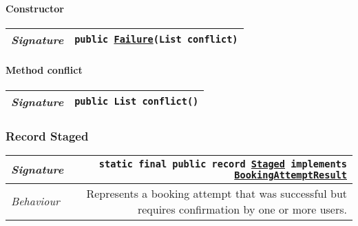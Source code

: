 \begin{adjustwidth}{1.5em}{0pt}
\begin{adjustwidth}{1.5em}{0pt}
\begin{adjustwidth}{1.5em}{0pt}
{\begin{tabularx}{1.0\linewidth}{@{}l R@{}}
      \end{tabularx}}\paragraph{Constructor\label{edu.kit.hci.soli.dto.BookingAttemptResult.Failure@edu.kit.hci.soli.dto.BookingAttemptResult.Failure(java.util.List)}}
      \begin{adjustwidth}{1.5em}{0pt}
        {\begin{tabularx}{1.0\linewidth}{@{}l R@{}}
          \emph{Signature} & \texttt{public \texttt{\hyperref[edu.kit.hci.soli.dto.BookingAttemptResult.Failure]{\texttt{Failure}}}(\texttt{List} conflict)} \\
          \hline
  
        \end{tabularx}}
      \end{adjustwidth}\paragraph{Method conflict\label{edu.kit.hci.soli.dto.BookingAttemptResult.Failure@conflict()}}
      \begin{adjustwidth}{1.5em}{0pt}
        {\begin{tabularx}{1.0\linewidth}{@{}l R@{}}
          \emph{Signature} & \texttt{public \texttt{List} conflict()} \\
          \hline
  
        \end{tabularx}}
      \end{adjustwidth}
    \end{adjustwidth}\subsubsection{Record Staged\label{edu.kit.hci.soli.dto.BookingAttemptResult.Staged} }
    \begin{adjustwidth}{1.5em}{0pt}
      {\begin{tabularx}{1.0\linewidth}{@{}l R@{}}
        \emph{Signature} & \texttt{static final public  record \texttt{\hyperref[edu.kit.hci.soli.dto.BookingAttemptResult.Staged]{\texttt{Staged}} implements \texttt{\hyperref[edu.kit.hci.soli.dto.BookingAttemptResult]{\texttt{BookingAttemptResult}}}}} \\
        \hline
        \emph{Behaviour} & Represents a booking attempt that was successful but requires confirmation by one or more users.  \\
        \hline
  

\end{tabularx}}
\end{adjustwidth}
\end{adjustwidth}
\end{adjustwidth}
